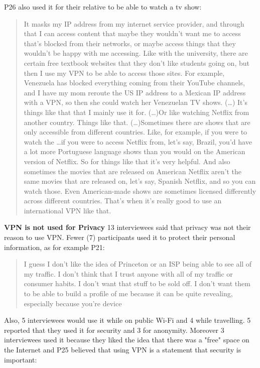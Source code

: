 P26 also used it for their relative to be able to watch a tv show:
\begin{quote}It masks my IP address from my internet service provider, and
    through that I can access content that maybe they wouldn't want me to
    access that's blocked from their networks, or maybe access things that
    they wouldn't be happy with me accessing. Like with the university, there
    are certain free textbook websites that they don't like students going on,
    but then I use my VPN to be able to access those sites. For example,
    Venezuela has blocked everything coming from their YouTube channels, and I
    have my mom reroute the US IP address to a Mexican IP address with a VPN,
    so then she could watch her Venezuelan TV shows. (\dots) It's things like
    that that I mainly use it for.  (\dots)Or like watching Netflix from
another country. Things like that. (\dots)Sometimes there are shows that are
only accessible from different countries. Like, for example, if you were to
watch the \dots if you were to access Netflix from, let's say, Brazil, you'd
have a lot more Portuguese language shows than you would on the American
version of Netflix. So for things like that it's very helpful. And also
sometimes the movies that are released on American Netflix aren't the same
movies that are released on, let's say, Spanish Netflix, and so you can watch
those. Even American-made shows are sometimes licensed differently across
different countries. That's when it's really good to use an international VPN
like that.\end{quote}

\textbf{VPN is not used for Privacy} 13 interviewees said that privacy was not
their reason to use VPN. Fewer (7) participants used it to protect their
personal information, as for example P21: \begin{quote}I guess I don't like
the idea of Princeton or an ISP being able to see all of my traffic. I don't
think that I trust anyone with all of my traffic or consumer habits. I don't
want that stuff to be sold off. I don't want them to be able to build a
profile of me because it can be quite revealing, especially because you're
device\end{quote}


Also, 5 interviewees would use it while on public Wi-Fi and 4 while
travelling. 5 reported that they used it for security and 3 for anonymity.
Moreover 3 interviewees used it because they liked the idea that there was a
"free" space on the Internet and P25 believed that using VPN is a statement
that security is important:


